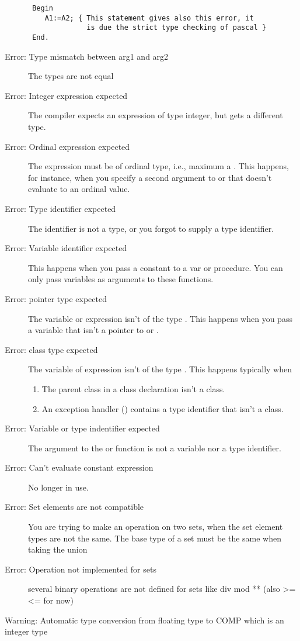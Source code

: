\begin{description}
\begin{verbatim}
 Begin
    A1:=A2; { This statement gives also this error, it
              is due the strict type checking of pascal }
 End.
 \end{verbatim}
\item [Error: Type mismatch between arg1 and arg2]
 The types are not equal
\item [Error: Integer expression expected]
 The compiler expects an expression of type integer, but gets a different
 type.
\item [Error: Ordinal expression expected]
 The expression must be of ordinal type, i.e., maximum a .
 This happens, for instance, when you specify a second argument
 to  or  that doesn't evaluate to an ordinal value.
\item [Error: Type identifier expected]
 The identifier is not a type, or you forgot to supply a type identifier.
\item [Error: Variable identifier expected]
 This happens when you pass a constant to a  var or 
 procedure. You can only pass variables as arguments to these functions.
\item [Error: pointer type expected]
 The variable or expression isn't of the type . This
 happens when you pass a variable that isn't a pointer to 
 or .
\item [Error: class type expected]
 The variable of expression isn't of the type . This happens
 typically when
 \begin{enumerate}
 \item The parent class in a class declaration isn't a class.
 \item An exception handler () contains a type identifier that
 isn't a class.
 \end{enumerate}
\item [Error: Variable or type indentifier expected]
 The argument to the  or  function is not a variable
 nor a type identifier.
\item [Error: Can't evaluate constant expression]
 No longer in use.
\item [Error: Set elements are not compatible]
 You are trying to make an operation on two sets, when the set element types
 are not the same. The base type of a set must be the same when taking the
 union
\item [Error: Operation not implemented for sets]
 several binary operations are not defined for sets
 like div mod ** (also >= <= for now)
\item [Warning: Automatic type conversion from floating type to COMP which is an integer type]

\end{description}
